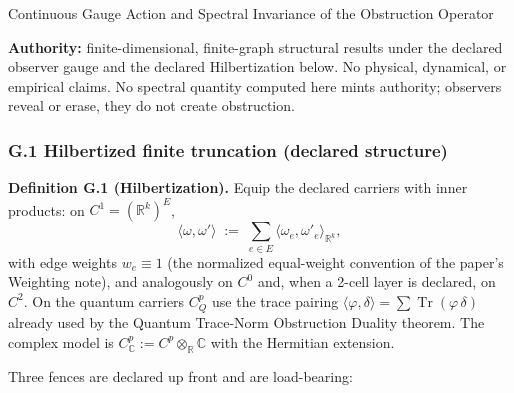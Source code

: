 \documentclass[
  11pt,
]{article}
\begin{document}
Continuous Gauge Action and Spectral Invariance of the Obstruction Operator

\textbf{Authority:} finite-dimensional, finite-graph structural results under the declared observer gauge and the declared Hilbertization below. No physical, dynamical, or empirical claims. No spectral quantity computed here mints authority; observers reveal or erase, they do not create obstruction.

\subsubsection{G.1 Hilbertized finite truncation (declared structure)}\label{g.1-hilbertized-finite-truncation-declared-structure}

\textbf{Definition G.1 (Hilbertization).} Equip the declared carriers with inner products: on \(C^1=(\mathbb R^k)^E\),
\[\langle\omega,\omega'\rangle \;:=\; \sum_{e\in E}\langle\omega_e,\omega'_e\rangle_{\mathbb R^k},\]
with edge weights \(w_e\equiv1\) (the normalized equal-weight convention of the paper's Weighting note), and analogously on \(C^0\) and, when a 2-cell layer is declared, on \(C^2\). On the quantum carriers \(C^p_Q\) use the trace pairing \(\langle\varphi,\delta\rangle=\sum\operatorname{Tr}(\varphi\,\delta)\) already used by the Quantum Trace-Norm Obstruction Duality theorem. The complex model is \(C^p_{\mathbb C}:=C^p\otimes_{\mathbb R}\mathbb C\) with the Hermitian extension.

Three fences are declared up front and are load-bearing:
\end{document}
